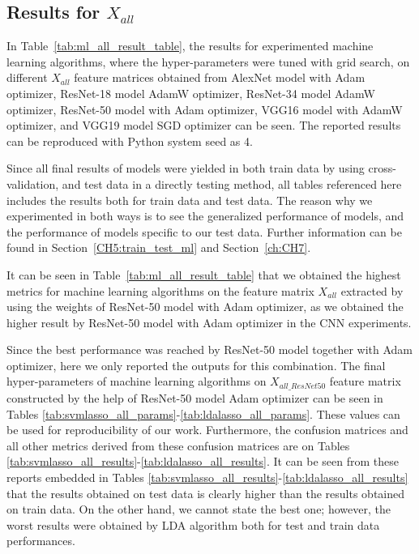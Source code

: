 \subsection{Results for $X_{all}$} \label{CH6:results_xall}

In Table~\ref{tab:ml_all_result_table}, the results for experimented machine learning algorithms, where the hyper-parameters were tuned with grid search, on different $X_{all}$ feature matrices obtained from AlexNet model with Adam optimizer, ResNet-18 model AdamW optimizer, ResNet-34 model AdamW optimizer, ResNet-50 model with Adam optimizer, VGG16 model with AdamW optimizer, and VGG19 model SGD optimizer can be seen. The reported results can be reproduced with Python system seed as 4. 

Since all final results of models were yielded in both train data by using cross-validation, and test data in a directly testing method, all tables referenced here includes the results both for train data and test data. The reason why we experimented in both ways is to see the generalized performance of models, and the performance of models specific to our test data. Further information can be found in Section~\ref{CH5:train_test_ml} and Section~\ref{ch:CH7}.

It can be seen in Table~\ref{tab:ml_all_result_table} that we obtained the highest metrics for machine learning algorithms on the feature matrix $X_{all}$ extracted by using the weights of ResNet-50 model with Adam optimizer, as we obtained the higher result by ResNet-50 model with Adam optimizer in the CNN experiments. 

Since the best performance was reached by ResNet-50 model together with Adam optimizer, here we only reported the outputs for this combination.
The final hyper-parameters of machine learning algorithms on $X_{all\_ResNet50}$ feature matrix constructed by the help of ResNet-50 model Adam optimizer can be seen in Tables \ref{tab:svmlasso_all_params}-\ref{tab:ldalasso_all_params}. These values can be used for reproducibility of our work. Furthermore, the confusion matrices and all other metrics derived from these confusion matrices are on Tables \ref{tab:svmlasso_all_results}-\ref{tab:ldalasso_all_results}.
 It can be seen from these reports embedded in Tables \ref{tab:svmlasso_all_results}-\ref{tab:ldalasso_all_results} that the results obtained on test data is clearly higher than the results obtained on train data. On the other hand, we cannot state the best one; however, the worst results were obtained by LDA algorithm both for test and train data performances. 

